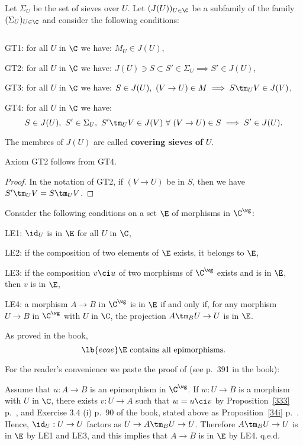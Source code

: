 \documentclass[12pt]{article}
\theoremstyle{remark}
\theoremstyle{definition}
\begin{document}
Let $\Sigma_U$ be the set of sieves over $U$. Let $(J(U))_{U\in\C}$ be a subfamily of the family $(\Sigma_U)_{U\in\C}$ and consider the following conditions:\bigskip

\begin{cond}
$\ $

\nn GT1: for all $U$ in $\C$ we have: $M_U\in J(U)$,

\nn GT2: for all $U$ in $\C$ we have: $J(U)\ni S\subset S'\in\Sigma_U\implies S'\in J(U)$,

\nn GT3: for all $U$ in $\C$ we have: $S\in J(U),\ (V\to U)\in M\implies S\tm_UV\in J(V)$,

\nn GT4: for all $U$ in $\C$ we have: 
$$
S\in J(U),\ S'\in\Sigma_U,\ S'\tm_UV\in J(V)\ \forall\ (V\to U)\in S\implies S'\in J(U).
$$
\end{cond}

The membres of $J(U)$ are called \textbf{covering sieves of} $U$.

\begin{prop}
Axiom GT2 follows from GT4.
\end{prop}
%
\begin{proof}
In the notation of GT2, if $(V\to U)$ be in $S$, then we have $S'\tm_UV=S\tm_UV$.
\end{proof}

Consider the following conditions on a set $\E$ of morphisms in $\C^\wg$:

\nn LE1: $\id_U$ is in $\E$ for all $U$ in $\C$,

\nn LE2: if the composition of two elements of $\E$ exists, it belongs to $\E$,

\nn LE3: if the composition $v\ci u$ of two morphisms of $\C^\wg$ exists and is in $\E$, then $v$ is in $\E$,

\nn LE4: a morphism $A\to B$ in $\C^\wg$ is in $\E$ if and only if, for any morphism $U\to B$ in $\C^\wg$ with $U$ in $\C$, the projection $A\tm_BU\to U$ is in $\E$.

As proved in the book, 
\begin{equation}\lb{ecae}
\E\text{ contains all epimorphisms.}
\end{equation}

For the reader's convenience we paste the proof of  (see p.~391 in the book):

Assume that $u:A\to B$ is an epimorphism in $\C^\wg$. If $w:U\to B$ is a morphism with $U$ in $\C$, there exists $v:U\to A$ such that $w=u\ci v$ by Proposition~\ref{333} p.~, and Exercise 3.4 (i) p.~90 of the book, stated above as Proposition~\ref{34i} p.~. Hence, $\id_U:U\to U$ factors as $U\to A\tm_BU\to U$. Therefore $A\tm_BU\to U$ is in $\E$ by LE1 and LE3, and this implies that $A\to B$ is in $\E$ by LE4. q.e.d.
\end{document}
